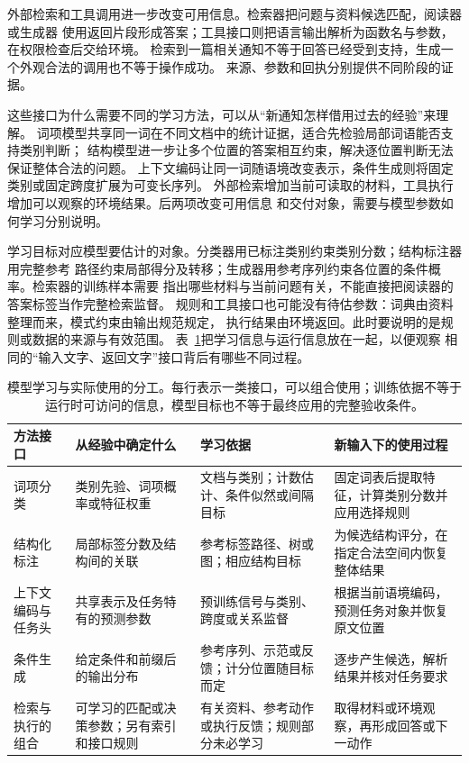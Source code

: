 外部检索和工具调用进一步改变可用信息。检索器把问题与资料候选匹配，阅读器或生成器
使用返回片段形成答案；工具接口则把语言输出解析为函数名与参数，在权限检查后交给环境。
检索到一篇相关通知不等于回答已经受到支持，生成一个外观合法的调用也不等于操作成功。
来源、参数和回执分别提供不同阶段的证据。

这些接口为什么需要不同的学习方法，可以从“新通知怎样借用过去的经验”来理解。
词项模型共享同一词在不同文档中的统计证据，适合先检验局部词语能否支持类别判断；
结构模型进一步让多个位置的答案相互约束，解决逐位置判断无法保证整体合法的问题。
上下文编码让同一词随语境改变表示，条件生成则将固定类别或固定跨度扩展为可变长序列。
外部检索增加当前可读取的材料，工具执行增加可以观察的环境结果。后两项改变可用信息
和交付对象，需要与模型参数如何学习分别说明。

学习目标对应模型要估计的对象。分类器用已标注类别约束类别分数；结构标注器用完整参考
路径约束局部得分及转移；生成器用参考序列约束各位置的条件概率。检索器的训练样本需要
指出哪些材料与当前问题有关，不能直接把阅读器的答案标签当作完整检索监督。
规则和工具接口也可能没有待估参数：词典由资料整理而来，模式约束由输出规范规定，
执行结果由环境返回。此时要说明的是规则或数据的来源与有效范围。
表~\ref{tab:nlp-learning-use-interfaces}把学习信息与运行信息放在一起，以便观察
相同的“输入文字、返回文字”接口背后有哪些不同过程。

\begin{table}[htbp]
  \centering
  \begin{tabularx}{\linewidth}{@{}p{30mm}XXX@{}}
    \toprule
    方法接口 & 从经验中确定什么 & 学习依据 & 新输入下的使用过程 \\
    \midrule
    词项分类
      & 类别先验、词项概率或特征权重
      & 文档与类别；计数估计、条件似然或间隔目标
      & 固定词表后提取特征，计算类别分数并应用选择规则 \\
    结构化标注
      & 局部标签分数及结构间的关联
      & 参考标签路径、树或图；相应结构目标
      & 为候选结构评分，在指定合法空间内恢复整体结果 \\
    上下文编码与任务头
      & 共享表示及任务特有的预测参数
      & 预训练信号与类别、跨度或关系监督
      & 根据当前语境编码，预测任务对象并恢复原文位置 \\
    条件生成
      & 给定条件和前缀后的输出分布
      & 参考序列、示范或反馈；计分位置随目标而定
      & 逐步产生候选，解析结果并核对任务要求 \\
    检索与执行的组合
      & 可学习的匹配或决策参数；另有索引和接口规则
      & 有关资料、参考动作或执行反馈；规则部分未必学习
      & 取得材料或环境观察，再形成回答或下一动作 \\
    \bottomrule
  \end{tabularx}
  \caption{模型学习与实际使用的分工。每行表示一类接口，可以组合使用；训练依据不等于
  运行时可访问的信息，模型目标也不等于最终应用的完整验收条件。}
  \label{tab:nlp-learning-use-interfaces}
\end{table}

